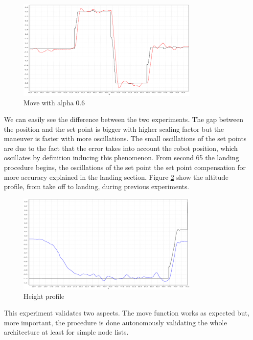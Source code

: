 \begin{figure}[h]
\centering
 \includegraphics[width=0.8\textwidth]{xalpha06.png}
 \caption{Move with alpha 0.6}
 \label{figure:xalpha06}
\end{figure}
We can easily see the difference between the two experiments. The gap between the position and the set point is bigger with higher scaling factor but the maneuver is faster with more oscillations. The small oscillations of the  set points are due to the fact that the error takes into account the robot position, which oscillates by definition inducing this phenomenon. From second 65 the landing procedure begins, the oscillations of the set point the set point compensation for more accuracy explained in the landing section. Figure \ref{figure:takeland} show the altitude profile, from take off to landing, during previous experiments. 

\begin{figure}[h]
\centering
 \includegraphics[width=0.8\textwidth]{takeland.png}
 \caption{Height profile}
 \label{figure:takeland}
\end{figure}

This experiment validates two aspects. The move function works as expected but, more important, the procedure is done autonomously validating the whole architecture at least for simple node lists. \\

